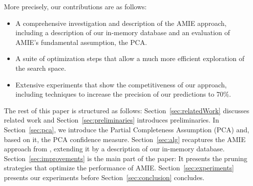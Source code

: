 \noindent More precisely, our contributions are as follows:
\begin{itemize}[noitemsep,nolistsep,leftmargin=0.4cm,midpenalty=0,label=$\bullet$]
\item A comprehensive investigation and description of the AMIE approach, including a description of our in-memory database and an evaluation of AMIE's fundamental assumption, the PCA. %
\item A suite of optimization steps that allow a much more efficient exploration of the search space.
\item Extensive experiments that show the competitiveness of our approach, including techniques to increase the precision of our predictions to 70\%.
\end{itemize}
The rest of this paper is structured as follows: Section~\ref{sec:relatedWork} discusses related work and Section~\ref{sec:preliminaries} introduces preliminaries.
In Section~\ref{sec:pca}, we introduce the Partial Completeness Assumption (PCA) and, based on it, the PCA confidence measure.
Section~\ref{sec:alg} recaptures the AMIE approach from \cite{amie}, extending it by a description of our in-memory database.
Section~\ref{sec:improvements} is the main part of the paper: It presents the pruning strategies that optimize the performance of AMIE.
Section~\ref{sec:experiments} presents our experiments before Section~\ref{sec:conclusion} concludes.





